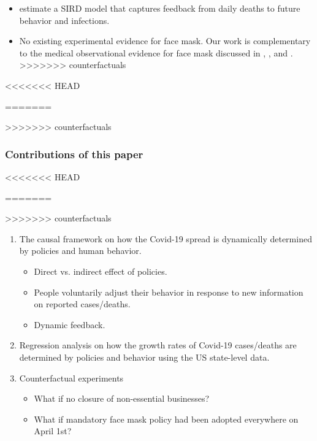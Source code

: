 \documentclass{beamer}
\begin{document}
\begin{frame}
\begin{frame}
\begin{itemize}
 \item  \cite{NBERw27128} estimate a SIRD model that captures feedback from daily deaths
to future behavior and infections.

\item No existing experimental evidence for face mask. Our work is complementary to the medical observational evidence  for face mask discussed in  \cite{Greenhalghm2020}, \cite{howard2020}, and
\cite{zhangr2020}.
>>>>>>> counterfactuals
\end{itemize}

\end{frame}


<<<<<<< HEAD
 
=======

>>>>>>> counterfactuals



\begin{frame}
  \frametitle{Contributions of this paper}\vspace{-0.05cm}
<<<<<<< HEAD
 
=======

>>>>>>> counterfactuals
 \begin{enumerate}
 \item The causal framework on how the Covid-19 spread  is dynamically determined by policies and human behavior.  \smallskip
 \begin{itemize}
 \item Direct  vs. indirect effect of policies.
 \item People voluntarily adjust their behavior in response to new information on reported cases/deaths.
 \item Dynamic feedback. \smallskip
 \end{itemize}
 \item Regression analysis on how the growth rates of  Covid-19 cases/deaths are determined by policies and behavior using the US state-level data.  \smallskip
 \item Counterfactual experiments \smallskip
 \begin{itemize}
 \item What if no closure of non-essential businesses?
 \item What if mandatory face mask policy had been adopted everywhere on April 1st?
 \end{itemize}
 \end{enumerate}


\end{frame}
\end{frame}
\end{document}
